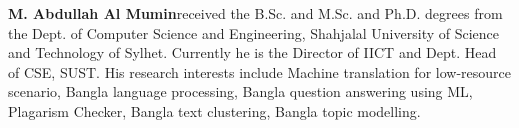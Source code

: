 \documentclass[two column]{ieeeaccess}
\begin{document}
\vspace{-3in}

\begin{IEEEbiography}{\textbf{M. Abdullah Al Mumin}}received the B.Sc. and M.Sc. and Ph.D. degrees from the Dept. of Computer Science and Engineering, Shahjalal University of Science and Technology of Sylhet. Currently he is the Director of IICT and Dept. Head of CSE, SUST. His research interests include Machine translation for low-resource scenario, Bangla language processing, Bangla question answering using ML, Plagarism Checker, Bangla text clustering, Bangla topic modelling.
\end{IEEEbiography}


\EOD
\end{document}

